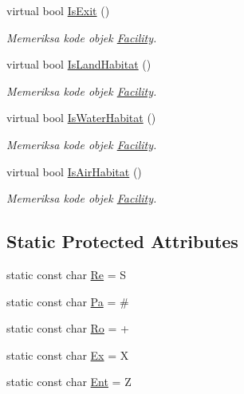 \begin{DoxyCompactItemize}
virtual bool \hyperlink{classFacility_aa6ed2cd4c8b1dc21a478c26707d16ef5}{Is\+Exit} ()
\begin{DoxyCompactList}\small\item\em Memeriksa kode objek \hyperlink{classFacility}{Facility}. \end{DoxyCompactList}\item 
virtual bool \hyperlink{classFacility_a1a8bbfab30dce85b0c581715cb4af1dd}{Is\+Land\+Habitat} ()
\begin{DoxyCompactList}\small\item\em Memeriksa kode objek \hyperlink{classFacility}{Facility}. \end{DoxyCompactList}\item 
virtual bool \hyperlink{classFacility_acaa21936227ef88450ab6834b5711a5c}{Is\+Water\+Habitat} ()
\begin{DoxyCompactList}\small\item\em Memeriksa kode objek \hyperlink{classFacility}{Facility}. \end{DoxyCompactList}\item 
virtual bool \hyperlink{classFacility_a6092a86c14a7c2003e2b020aa28fc06f}{Is\+Air\+Habitat} ()
\begin{DoxyCompactList}\small\item\em Memeriksa kode objek \hyperlink{classFacility}{Facility}. \end{DoxyCompactList}\end{DoxyCompactItemize}
\subsection*{Static Protected Attributes}
\begin{DoxyCompactItemize}
\item 
static const char \hyperlink{classFacility_a0c187566e945c796ffb5679d6c34287b}{Re} = \textquotesingle{}S\textquotesingle{}
\item 
static const char \hyperlink{classFacility_a5588f173a18205498f4c3bfd3c04d28c}{Pa} = \textquotesingle{}\#\textquotesingle{}
\item 
static const char \hyperlink{classFacility_ac6279190b255cdb87040af59e849543a}{Ro} = \textquotesingle{}+\textquotesingle{}
\item 
static const char \hyperlink{classFacility_ad30246918df96bd5a4e63063a1a1ae2e}{Ex} = \textquotesingle{}X\textquotesingle{}
\item 
static const char \hyperlink{classFacility_a2946221d924add37fc2a4aab5912dc60}{Ent} = \textquotesingle{}Z\textquotesingle{}
\end{DoxyCompactItemize}


